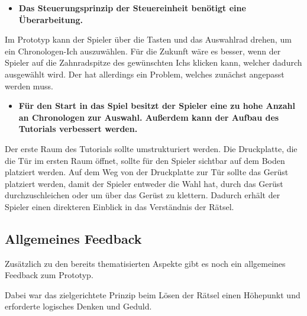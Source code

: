 \begin{itemize}  
    \item \textbf{Das Steuerungsprinzip der Steuereinheit benötigt eine Überarbeitung.}
\end{itemize}

Im Prototyp kann der Spieler über die Tasten  und  das Auswahlrad drehen, um ein Chronologen-Ich auszuwählen. Für die Zukunft wäre es besser, wenn der Spieler auf die Zahnradspitze des gewünschten Ichs klicken kann, welcher dadurch ausgewählt wird. Der  hat allerdings ein Problem, welches zunächst angepasst werden muss.

\begin{itemize}  
    \item \textbf{Für den Start in das Spiel besitzt der Spieler eine zu hohe Anzahl an Chronologen zur Auswahl. Außerdem kann der Aufbau des Tutorials verbessert werden.}
\end{itemize}

Der erste Raum des Tutorials sollte umstrukturiert werden. Die Druckplatte, die die Tür im ersten Raum öffnet, sollte für den Spieler sichtbar auf dem Boden platziert werden. Auf dem Weg von der Druckplatte zur Tür sollte das Gerüst platziert werden, damit der Spieler entweder die Wahl hat, durch das Gerüst durchzuschleichen oder um über das Gerüst zu klettern. Dadurch erhält der Spieler einen direkteren Einblick in das Verständnis der Rätsel.

\subsection{Allgemeines Feedback}
Zusätzlich zu den bereits thematisierten Aspekte gibt es noch ein allgemeines Feedback zum Prototyp.

Dabei war das zielgerichtete Prinzip beim Lösen der Rätsel einen Höhepunkt und erforderte logisches Denken und Geduld. 

